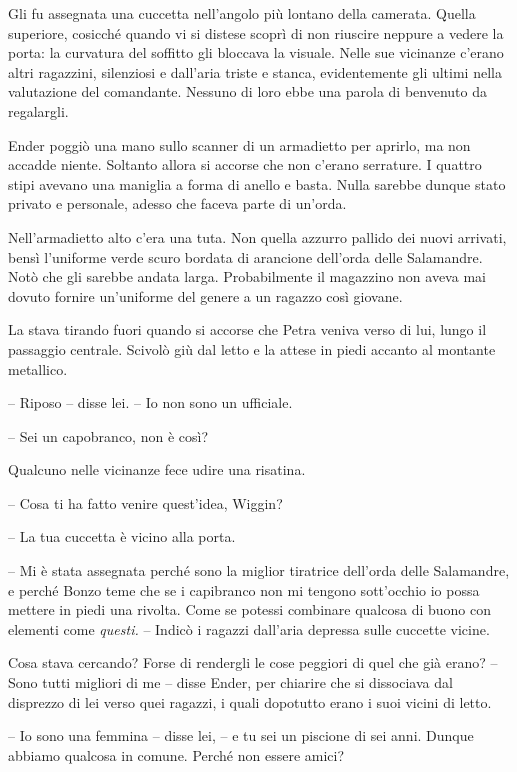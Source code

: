 {Gli fu assegnata una cuccetta nell'angolo più lontano della camerata.
	Quella superiore, cosicché quando vi si distese scoprì di non riuscire
	neppure a vedere la porta: la curvatura del soffitto gli bloccava la
	visuale. Nelle sue vicinanze c'erano altri ragazzini, silenziosi e
	dall'aria triste e stanca, evidentemente gli ultimi nella valutazione
	del comandante. Nessuno di loro ebbe una parola di benvenuto da
	regalargli.}

{Ender poggiò una mano sullo scanner di un armadietto per aprirlo, ma
	non accadde niente. Soltanto allora si accorse che non c'erano
	serrature. I quattro stipi avevano una maniglia a forma di anello e
	basta. Nulla sarebbe dunque stato privato e personale, adesso che faceva
	parte di un'orda.}

{Nell'armadietto alto c'era una tuta. Non quella azzurro pallido dei
	nuovi arrivati, bensì l'uniforme verde scuro bordata di arancione
	dell'orda delle Salamandre. Notò che gli sarebbe andata larga.
	Probabilmente il magazzino non aveva mai dovuto fornire un'uniforme del
	genere a un ragazzo così giovane.}

{La stava tirando fuori quando si accorse che Petra veniva verso di lui,
	lungo il passaggio centrale. Scivolò giù dal letto e la attese in piedi
	accanto al montante metallico.}

{-- Riposo -- disse lei. -- Io non sono un ufficiale.}

{-- Sei un capobranco, non è così?}

{Qualcuno nelle vicinanze fece udire una risatina.}

{-- Cosa ti ha fatto venire quest'idea, Wiggin?}

{-- La tua cuccetta è vicino alla porta.}

{-- Mi è stata assegnata perché sono la miglior tiratrice dell'orda
	delle Salamandre, e perché Bonzo teme che se i capibranco non mi tengono
	sott'occhio io possa mettere in piedi una rivolta. Come se potessi
	combinare qualcosa di buono con elementi come \emph{questi.} -- Indicò i
	ragazzi dall'aria depressa sulle cuccette vicine.}

{Cosa stava cercando? Forse di rendergli le cose peggiori di quel che
	già erano? -- Sono tutti migliori di me -- disse Ender, per chiarire che
	si dissociava dal disprezzo di lei verso quei ragazzi, i quali dopotutto
	erano i suoi vicini di letto.}

{-- Io sono una femmina -- disse lei, -- e tu sei un piscione di sei
	anni. Dunque abbiamo qualcosa in comune. Perché non essere amici?}

